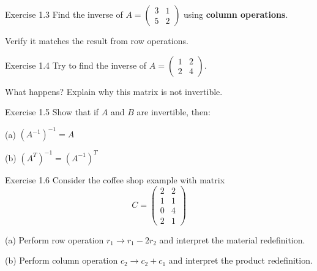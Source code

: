 \documentclass[10pt]{beamer}
\theoremstyle{definition}
\newcommand{\x}[1]{\alert{\textbf{#1}}}
\begin{document}
\begin{frame}{Exercise 1.3}
Find the inverse of $A = \begin{pmatrix} 3 & 1 \\ 5 & 2 \end{pmatrix}$ using \x{column operations}.

Verify it matches the result from row operations.
\end{frame}

\begin{frame}{Exercise 1.4}
Try to find the inverse of $A = \begin{pmatrix} 1 & 2 \\ 2 & 4 \end{pmatrix}$.

What happens? Explain why this matrix is not invertible.
\end{frame}

\begin{frame}{Exercise 1.5}
Show that if $A$ and $B$ are invertible, then:

(a) $(A^{-1})^{-1} = A$

\vspace{0.5cm}
(b) $(A^T)^{-1} = (A^{-1})^T$
\end{frame}

\begin{frame}{Exercise 1.6}
Consider the coffee shop example with matrix
$$C = \begin{pmatrix} 2 & 2 \\ 1 & 1 \\ 0 & 4 \\ 2 & 1 \end{pmatrix}$$

(a) Perform row operation $r_1 \to r_1 - 2r_2$ and interpret the material redefinition.

(b) Perform column operation $c_2 \to c_2 + c_1$ and interpret the product redefinition.
\end{frame}

\end{document}
